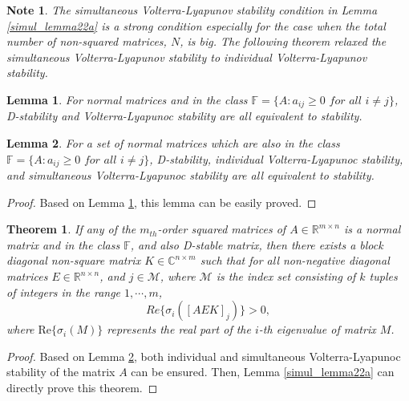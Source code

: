 \documentclass{article}
\newtheorem{theorem}{Theorem}
\newtheorem{lemma}{Lemma}
\newtheorem{note}{Note}
\newtheorem{proof}{Proof}
\begin{document}
\begin{note}
The simultaneous Volterra-Lyapunov stability condition in Lemma \ref{simul_lemma22a} is a strong condition especially for the case when the total number of non-squared matrices, $N$, is big. The following theorem relaxed the simultaneous Volterra-Lyapunov stability to individual Volterra-Lyapunov stability. 
\end{note}

\begin{lemma} \label{lem2} \cite{Cross:-Thre}
For normal matrices and in the class $\mathbb{F} = \{A : a_{ij} \ge 0 \,\,for \,\,all \,\, i \ne j \}$, D-stability and Volterra-Lyapunoc stability are all equivalent to stability. 
\end{lemma}

\begin{lemma} \label{lem33} 
For a set of normal matrices which are also in the class $\mathbb{F} = \{A : a_{ij} \ge 0 \,\,for \,\,all \,\, i \ne j \}$, D-stability, individual Volterra-Lyapunoc stability, and simultaneous Volterra-Lyapunoc stability are all equivalent to stability. 
\end{lemma}
\begin{proof}
Based on Lemma \ref{lem2}, this lemma can be easily proved.   
\end{proof}

\begin{theorem}  \label{mainreslt}
If any of the $m_{th}$-order squared matrices of  $A \in \mathbb{R}^{m \times n}$ is a normal matrix and in the class  $\mathbb{F}$, and also D-stable matrix,
then there exists a block diagonal non-square matrix $K \in \mathbb{C}^{n \times m}$ such that for all non-negative diagonal matrices $E \in  \mathbb{R}^{n \times n}$, and $j \in \mathcal{M}$, where $\mathcal{M}$ is the index set consisting of $k$ tuples of integers in the
range $1,\cdots, m$,
\begin{equation}\label{suf_con}
Re\{ \sigma_i ( [A E K]_j ) \} >0,
\end{equation}
where $\text{Re} \{ \sigma_i (M) \}$ represents the real part of the $i$-th eigenvalue of matrix $M$.
\end{theorem}
\begin{proof}
Based on Lemma \ref{lem33}, both individual and simultaneous Volterra-Lyapunoc stability of the matrix $A$ can be ensured. Then,  Lemma \ref{simul_lemma22a} can directly prove this theorem.
\end{proof}
\end{document}
